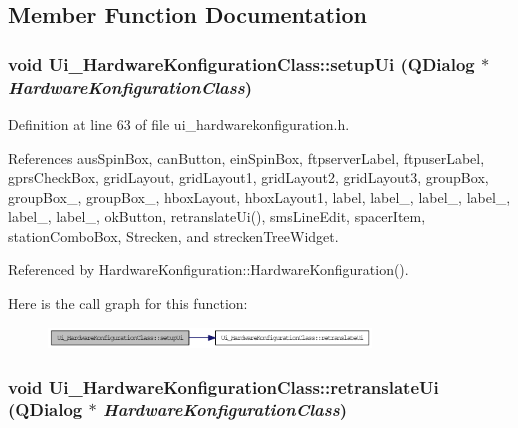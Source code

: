 \subsection{Member Function Documentation}
\hypertarget{class_ui___hardware_konfiguration_class_4c1da234ff2e595c09d91bc7163e9473}{
\subsubsection[setupUi]{\setlength{\rightskip}{0pt plus 5cm}void Ui\_\-HardwareKonfigurationClass::setupUi (QDialog $\ast$ {\em HardwareKonfigurationClass})}}
\label{class_ui___hardware_konfiguration_class_4c1da234ff2e595c09d91bc7163e9473}




Definition at line 63 of file ui\_\-hardwarekonfiguration.h.

References ausSpinBox, canButton, einSpinBox, ftpserverLabel, ftpuserLabel, gprsCheckBox, gridLayout, gridLayout1, gridLayout2, gridLayout3, groupBox, groupBox\_, groupBox\_, hboxLayout, hboxLayout1, label, label\_, label\_, label\_, label\_, label\_, okButton, retranslateUi(), smsLineEdit, spacerItem, stationComboBox, Strecken, and streckenTreeWidget.

Referenced by HardwareKonfiguration::HardwareKonfiguration().

Here is the call graph for this function:\nopagebreak
\begin{figure}[H]
\begin{center}
\leavevmode
\includegraphics[width=243pt]{class_ui___hardware_konfiguration_class_4c1da234ff2e595c09d91bc7163e9473_cgraph}
\end{center}
\end{figure}
\hypertarget{class_ui___hardware_konfiguration_class_0e48e8e80382f195341a76922ff926b1}{
\subsubsection[retranslateUi]{\setlength{\rightskip}{0pt plus 5cm}void Ui\_\-HardwareKonfigurationClass::retranslateUi (QDialog $\ast$ {\em HardwareKonfigurationClass})}}
\label{class_ui___hardware_konfiguration_class_0e48e8e80382f195341a76922ff926b1}




